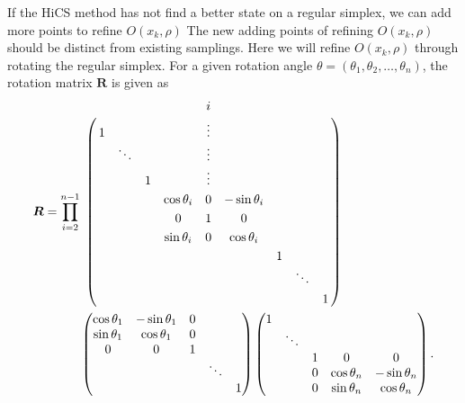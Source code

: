 \documentclass[final,1p,times]{elsarticle}
\begin{document}
If the HiCS method has not find a better state on a regular
simplex, we can add more points to refine $O(x_k, \rho)$
The new adding points of refining $O(x_k, \rho)$ should be
distinct from existing samplings. 
Here we will refine $O(x_k, \rho)$ through rotating the regular simplex. 
For a given rotation angle $\theta=(\theta_1,\theta_2,\dots,\theta_{n})$, the
rotation matrix $\bm R$ is given as 
\begin{equation}
\begin{aligned}
	{\bm R} = 
	 \prod_{i=2}^{n-1} &
\bordermatrix{
  &  &       &  & 		   & i &		   &  &  & \cr
  & 1&       &  & 		   & \vdots  & 		   &  &  &  \cr
  &  & \ddots&  & 		   & \vdots  & 		   &  &  &  \cr
  &  &       & 1&          & \vdots  & 		   &  &  &  \cr
  &  &       &  & \cos \theta_i & 0 & -\sin \theta_i &  &  &  \cr
  &  &       &  &   0	 & 1 &     0     &  &  & \cr 
  &  &       &  & \sin \theta_i & 0 &  \cos \theta_i &  &  &  \cr
  &  &       &  &          &   &           & 1 & &  \cr
  &  &       &  &          &   &           &  & \ddots &   \cr
  &  &       &  &          &   &           &  &  & 1 
}
\\
	& \begin{pmatrix}
  \cos \theta_1 & -\sin \theta_1 & 0 &  		&   \\
  \sin \theta_1 & \cos \theta_1  & 0 & 	 	& 	\\
  	0	   &      0    & 1 & 		&   \\
  		   & 		   &   & \ddots &   \\
  		   & 		   &   &   		& 1 
	\end{pmatrix}
	\begin{pmatrix}
  1 &  &  &  		&   \\
    & \ddots  &  & 	 	& 	\\
    &    & 1 & 	0	& 0  \\
    &    & 0 & \cos\theta_n & -\sin\theta_n  \\
    & 	 & 0 &  \sin\theta_n & \cos\theta_n 
	\end{pmatrix}.
\end{aligned}
	\label{}
\end{equation}
\end{document}
